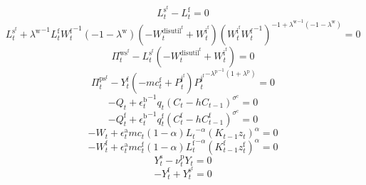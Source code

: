 \begin{equation}
L^{\mathrm{s}^{\mathrm{f}}}_{t} - L^{\mathrm{f}}_{t} = 0
\end{equation}
\begin{equation}
L^{\mathrm{s}^{\mathrm{f}}}_{t} + {\lambda^{\mathrm{w}}}^{-1} {L^{\mathrm{f}}_{t}} {W^{\mathrm{f}}_{t}}^{-1} \left(-1 - \lambda^{\mathrm{w}}\right) \left(-W^{\mathrm{disutil}^{\mathrm{f}}}_{t} + W^{\mathrm{i}^{\mathrm{f}}}_{t}\right) {\left({W^{\mathrm{i}^{\mathrm{f}}}_{t}} {W^{\mathrm{f}}_{t}}^{-1}\right)^{-1 + {\lambda^{\mathrm{w}}}^{-1} \left(-1 - \lambda^{\mathrm{w}}\right)}} = 0
\end{equation}
\begin{equation}
\Pi^{\mathrm{ws}^{\mathrm{f}}}_{t} - {L^{\mathrm{s}^{\mathrm{f}}}_{t}} \left(-W^{\mathrm{disutil}^{\mathrm{f}}}_{t} + W^{\mathrm{i}^{\mathrm{f}}}_{t}\right) = 0
\end{equation}
\begin{equation}
\Pi^{\mathrm{ps}^{\mathrm{f}}}_{t} - {Y^{\mathrm{f}}_{t}} \left(-{m\!c}^{\mathrm{f}}_{t} + P^{\mathrm{j}^{\mathrm{f}}}_{t}\right) {{P^{\mathrm{j}^{\mathrm{f}}}_{t}}^{-{\lambda^{\mathrm{p}}}^{-1} \left(1 + \lambda^{\mathrm{p}}\right)}} = 0
\end{equation}
\begin{equation}
-Q_{t} + {\epsilon^{\mathrm{b}}_{t}}^{-1} {q_{t}} {\left(C_{t} - {h} {C_{t-1}}\right)^{\sigma^{\mathrm{c}}}} = 0
\end{equation}
\begin{equation}
-Q^{\mathrm{f}}_{t} + {\epsilon^{\mathrm{b}}_{t}}^{-1} {q^{\mathrm{f}}_{t}} {\left(C^{\mathrm{f}}_{t} - {h} {C^{\mathrm{f}}_{t-1}}\right)^{\sigma^{\mathrm{c}}}} = 0
\end{equation}
\begin{equation}
-W_{t} + {\epsilon^{\mathrm{a}}_{t}} {{m\!c}_{t}} \left(1 - \alpha\right) {{L_{t}}^{-\alpha}} {\left({K_{t-1}} {z_{t}}\right)^{\alpha}} = 0
\end{equation}
\begin{equation}
-W^{\mathrm{f}}_{t} + {\epsilon^{\mathrm{a}}_{t}} {{m\!c}^{\mathrm{f}}_{t}} \left(1 - \alpha\right) {{L^{\mathrm{f}}_{t}}^{-\alpha}} {\left({K^{\mathrm{f}}_{t-1}} {z^{\mathrm{f}}_{t}}\right)^{\alpha}} = 0
\end{equation}
\begin{equation}
Y^{\mathrm{s}}_{t} - {\nu^{\mathrm{p}}_{t}} {Y_{t}} = 0
\end{equation}
\begin{equation}
-Y^{\mathrm{f}}_{t} + Y^{\mathrm{s}^{\mathrm{f}}}_{t} = 0
\end{equation}

